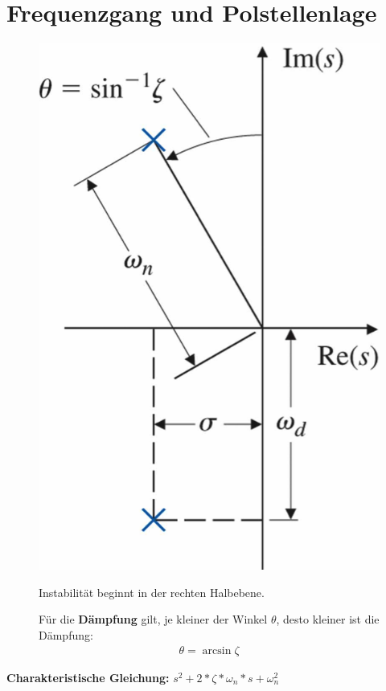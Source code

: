 \setcounter{section}{3}
\section{Frequenzgang und Polstellenlage}
\begin{tcolorbox}[colback=white!10!white,colframe=green!30!black,title=PT$_2$ - Glied] 
    \begin{figure}[H]
        \begin{minipage}{.3\textwidth}
            \centering
            \includegraphics[width=1\textwidth]{images/winkel}
        \end{minipage}%
        \hspace{1cm}
        \begin{minipage}{.6\textwidth}
            Instabilität beginnt in der rechten Halbebene. 
            
            Für die  \textbf{Dämpfung} gilt, je kleiner der Winkel $\theta$, desto kleiner ist die Dämpfung: \begin{align*}
                \theta = \arcsin{\zeta}
            \end{align*}
        \end{minipage}%
        
    \end{figure}
    \textbf{Charakteristische Gleichung:} $s^2+2*\zeta*\omega_n*s+\omega_n^2$
\end{tcolorbox}

